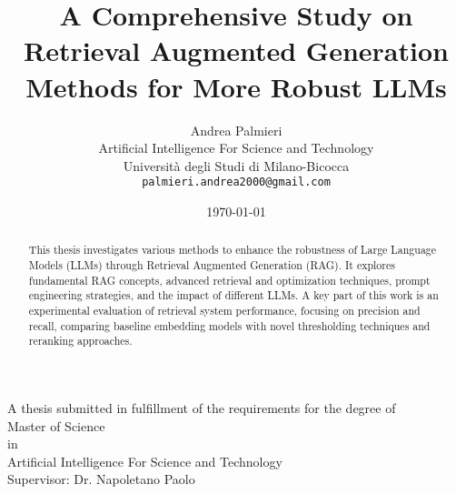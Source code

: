 \documentclass[12pt, a4paper]{report} %
\title{A Comprehensive Study on Retrieval Augmented Generation Methods for More Robust LLMs}
\author{Andrea Palmieri \\
        Artificial Intelligence For Science and Technology \\
        Università degli Studi di Milano-Bicocca \\
        \texttt{palmieri.andrea2000@gmail.com}}
\date{\today} %
\begin{document}
\begin{titlepage}
    \centering
    \vspace*{1cm} %
    {\Huge\bfseries \thetitle \par} %
    \vspace{1.5cm}
    {\Large \theauthor \par} %
    \vspace{2cm}
    A thesis submitted in fulfillment of the requirements for the degree of \\
    \vspace{0.5cm}
    {\Large Master of Science} \\
    in \\
    {\Large Artificial Intelligence For Science and Technology} \\
    \vspace{2cm}
    {\large Supervisor: Dr. Napoletano Paolo} \\ %
    \vfill %
    {\large \thedate \par} %
\end{titlepage}

\maketitle %

\begin{abstract}
    This thesis investigates various methods to enhance the robustness of Large Language Models (LLMs) through Retrieval Augmented Generation (RAG). It explores fundamental RAG concepts, advanced retrieval and optimization techniques, prompt engineering strategies, and the impact of different LLMs. A key part of this work is an experimental evaluation of retrieval system performance, focusing on precision and recall, comparing baseline embedding models with novel thresholding techniques and reranking approaches.
\end{abstract}

\tableofcontents %

\onehalfspacing %










\printbibliography %
\end{document}
